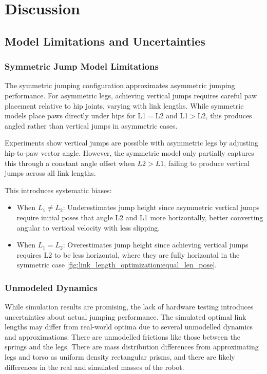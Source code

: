 \section{Discussion}

\subsection{Model Limitations and Uncertainties}

\subsubsection{Symmetric Jump Model Limitations}
The symmetric jumping configuration approximates asymmetric jumping performance. For asymmetric legs, achieving vertical jumps requires careful paw placement relative to hip joints, varying with link lengths. While symmetric models place paws directly under hips for L1$=$L2 and L1$>$L2, this produces angled rather than vertical jumps in asymmetric cases.

Experiments show vertical jumps are possible with asymmetric legs by adjusting hip-to-paw vector angle. However, the symmetric model only partially captures this through a constant angle offset when $L2 > L1$, failing to produce vertical jumps across all link lengths.

This introduces systematic biases:
\begin{itemize}
    \item When \(L_1 \neq L_2\): Underestimates jump height since asymmetric vertical jumps require initial poses that angle L2 and L1 more horizontally, better converting angular to vertical velocity with less slipping.
    \item When \(L_1 = L_2\): Overestimates jump height since achieving vertical jumps requires L2 to be less horizontal, where they are fully horizontal in the symmetric case \ref{fig:link_length_optimization:equal_len_pose}.
\end{itemize}



\subsubsection{Unmodeled Dynamics}
While simulation results are promising, the lack of hardware testing introduces uncertainties about actual jumping performance. The 
simulated optimal link lengths may differ from real-world optima due to several unmodelled dynamics and approximations. There are 
unmodelled frictions like those between the springs and the legs. There are mass distribution differences from approximating legs and 
torso as uniform density rectangular prisms, and there are likely differences in the real and simulated masses of the robot.

